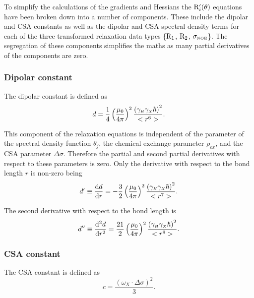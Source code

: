 To simplify the calculations of the gradients and Hessians the $\mathrm{R}_i'(\theta)$ equations have been broken down into a number of components.  These include the dipolar and CSA constants as well as the dipolar and CSA spectral density terms for each of the three transformed relaxation data types \{$\mathrm{R}_1$, $\mathrm{R}_2$, $\sigma_{\scriptscriptstyle \mathrm{NOE}}$\}.  The segregation of these components simplifies the maths as many partial derivatives of the components are zero.


\subsubsection{Dipolar constant}

The dipolar constant is defined as
\begin{equation}
    d = \frac{1}{4} \left(\frac{\mu_0}{4\pi}\right)^2 \frac{\left( \gamma_{\scriptscriptstyle H} \gamma_{\scriptscriptstyle X} \hbar \right)^2}{<r^6>}. \label{eq: Ri': d}
\end{equation}

\noindent This component of the relaxation equations is independent of the parameter of the spectral density function $\theta_j$, the chemical exchange parameter $\rho_{ex}$, and the CSA parameter $\Delta\sigma$.  Therefore the partial and second partial derivatives with respect to these parameters is zero.  Only the derivative with respect to the bond length $r$ is non-zero being
\begin{equation}
    d' \equiv \frac{\mathrm{d} d}{\mathrm{d} r} = - \frac{3}{2} \left(\frac{\mu_0}{4\pi}\right)^2 \frac{\left( \gamma_{\scriptscriptstyle H} \gamma_{\scriptscriptstyle X} \hbar \right)^2}{<r^7>}. \label{eq: Ri': d'}
\end{equation}

\noindent The second derivative with respect to the bond length is
\begin{equation}
    d'' \equiv \frac{\mathrm{d}^2 d}{\mathrm{d} r^2} = \frac{21}{2} \left(\frac{\mu_0}{4\pi}\right)^2 \frac{\left( \gamma_{\scriptscriptstyle H} \gamma_{\scriptscriptstyle X} \hbar \right)^2}{<r^8>}. \label{eq: Ri': d"}
\end{equation}


\subsubsection{CSA constant}

The CSA constant is defined as
\begin{equation}
    c = \frac{\left(\omega_X \cdot \Delta\sigma \right)^2}{3}. \label{eq: Ri': c}
\end{equation}


